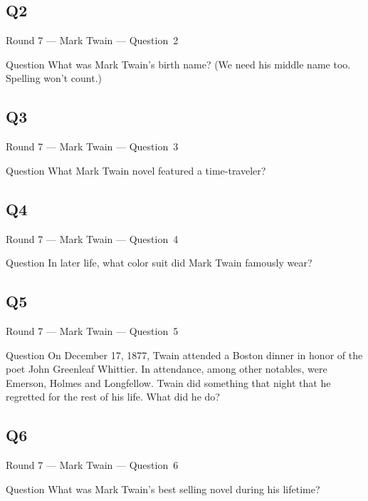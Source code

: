 \documentclass[11pt]{beamer}
\begin{document}
\subsection*{Q2}
\begin{frame}[t]{Round 7 --- Mark Twain --- \mbox{Question 2}}
\vspace{-0.5em}
\begin{block}{Question}
What was Mark Twain's birth name? (We need his middle name too. Spelling won't count.)
\end{block}
\end{frame}
\subsection*{Q3}
\begin{frame}[t]{Round 7 --- Mark Twain --- \mbox{Question 3}}
\vspace{-0.5em}
\begin{block}{Question}
What Mark Twain novel featured a time-traveler?
\end{block}
\end{frame}
\subsection*{Q4}
\begin{frame}[t]{Round 7 --- Mark Twain --- \mbox{Question 4}}
\vspace{-0.5em}
\begin{block}{Question}
In later life, what color suit did Mark Twain famously wear?
\end{block}
\end{frame}
\subsection*{Q5}
\begin{frame}[t]{Round 7 --- Mark Twain --- \mbox{Question 5}}
\vspace{-0.5em}
\begin{block}{Question}
On December 17, 1877, Twain attended a Boston dinner in honor of the poet John Greenleaf Whittier. In attendance, among other notables, were Emerson, Holmes and Longfellow.  Twain did something that night that he regretted for the rest of his life. What did he do? 
\end{block}
\end{frame}
\subsection*{Q6}
\begin{frame}[t]{Round 7 --- Mark Twain --- \mbox{Question 6}}
\vspace{-0.5em}
\begin{block}{Question}
What was Mark Twain's best selling novel during his lifetime?
\end{block}
\end{frame}
\end{document}
